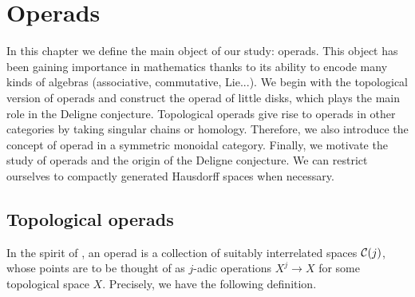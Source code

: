 \documentclass[TFM.tex]{subfiles}
\begin{document}
\chapter{Operads}\label{3}


In this chapter we define the main object of our study: operads. This object has been gaining importance in mathematics thanks to its ability to encode many kinds of algebras (associative, commutative, Lie...). We begin with the topological version of operads and construct the operad of little disks, which plays the main role in the Deligne conjecture. Topological operads give rise to operads in other categories by taking singular chains or homology. Therefore, we also introduce the concept of operad in a symmetric monoidal category. Finally, we motivate the study of operads and the origin of the Deligne conjecture. We can restrict ourselves to compactly generated Hausdorff spaces when necessary. 




\section{Topological operads}
%
In the spirit of \cite{May}, an operad is a collection of suitably interrelated spaces $\mathcal{C}(j)$, whose points are to
be thought of as $j$-adic operations $X^j \to X$ for some topological space $X$. Precisely, we have the following definition.
\end{document}
